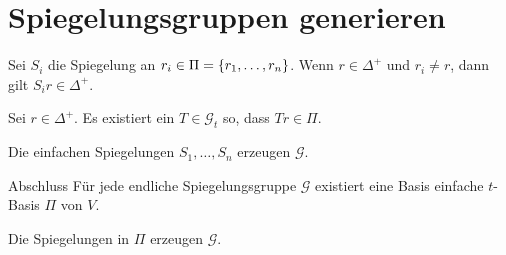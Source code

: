 \documentclass[18pt, handout]{beamer}
\begin{document}
\section{Spiegelungsgruppen generieren}
\begin{frame}
    \begin{satz} %
        Sei \( S_i \) die Spiegelung an 
        \( r_i \in \Pi = \{r_1, \ldots, r_n\} \).
        Wenn \( r \in \Delta^+ \) und \( r_i \neq r \), 
        dann gilt \( S_i r \in \Delta^+ \).
    \end{satz}
    \pause
    \begin{satz} %
        Sei \( r \in \Delta^+ \). Es existiert ein \( T \in 
        \mathscr{G}_t \) so, dass 
        \( Tr \in \Pi \).
    \end{satz}\pause
    \begin{satz} %
        Die einfachen Spiegelungen \( S_1, \ldots, S_n \) 
        erzeugen \( \mathscr{G} \).
    \end{satz}
\end{frame}

\begin{frame}{Abschluss}
    Für jede endliche Spiegelungsgruppe 
    \( \mathscr{G} \) existiert eine Basis 
    einfache \( t \)-Basis \( \Pi \) 
    von \( V \). 
    \pause
    
    Die Spiegelungen in 
    \( \Pi \) erzeugen \( \mathscr{G} \).
\end{frame}
\end{document}
